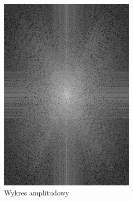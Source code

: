 \begin{figure}[ht]
\begin{minipage}[t]{0.325\linewidth}
        \includegraphics[width=\linewidth]{Rozdziały/02.Podstawy_teoretyczne/fft_magnitude.png}
        \caption{Wykres amplitudowy}
        \label{fig:image25}
    \end{minipage}
    \begin{minipage}[t]{0.325\linewidth}

\end{minipage}
\end{figure}
